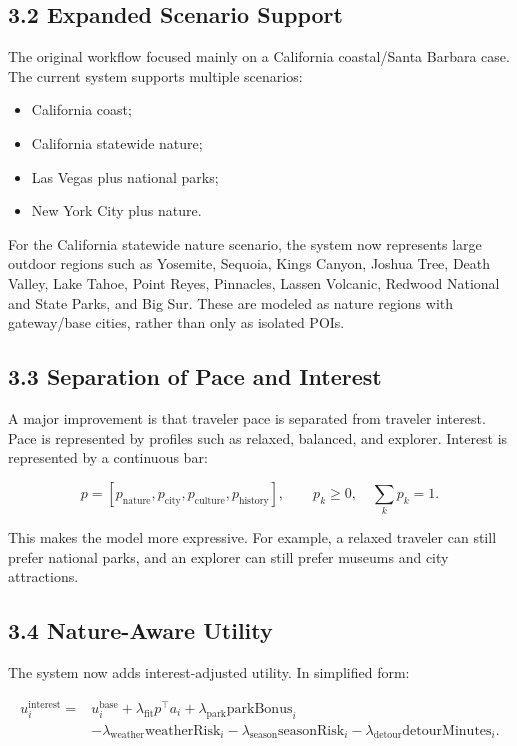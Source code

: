 \documentclass[11pt,a4paper]{article}
\begin{document}
\subsection*{3.2 Expanded Scenario Support}

\noindent The original workflow focused mainly on a California coastal/Santa Barbara case. The current system supports multiple scenarios:

\begin{itemize}
    \item California coast;
    \item California statewide nature;
    \item Las Vegas plus national parks;
    \item New York City plus nature.
\end{itemize}

\noindent For the California statewide nature scenario, the system now represents large outdoor regions such as Yosemite, Sequoia, Kings Canyon, Joshua Tree, Death Valley, Lake Tahoe, Point Reyes, Pinnacles, Lassen Volcanic, Redwood National and State Parks, and Big Sur. These are modeled as nature regions with gateway/base cities, rather than only as isolated POIs.

\subsection*{3.3 Separation of Pace and Interest}

\noindent A major improvement is that traveler pace is separated from traveler interest. Pace is represented by profiles such as relaxed, balanced, and explorer. Interest is represented by a continuous bar:

\[
p = [p_{\mathrm{nature}}, p_{\mathrm{city}}, p_{\mathrm{culture}}, p_{\mathrm{history}}],
\qquad p_k \geq 0,\quad \sum_k p_k = 1.
\]

\noindent This makes the model more expressive. For example, a relaxed traveler can still prefer national parks, and an explorer can still prefer museums and city attractions.

\subsection*{3.4 Nature-Aware Utility}

\noindent The system now adds interest-adjusted utility. In simplified form:

\[
\begin{array}{rl}
u_i^{\mathrm{interest}} = &
u_i^{\mathrm{base}}
+ \lambda_{\mathrm{fit}} p^\top a_i
+ \lambda_{\mathrm{park}} \mathrm{parkBonus}_i \\[0.25em]
& - \lambda_{\mathrm{weather}} \mathrm{weatherRisk}_i
- \lambda_{\mathrm{season}} \mathrm{seasonRisk}_i
- \lambda_{\mathrm{detour}} \mathrm{detourMinutes}_i .
\end{array}
\]
\end{document}
